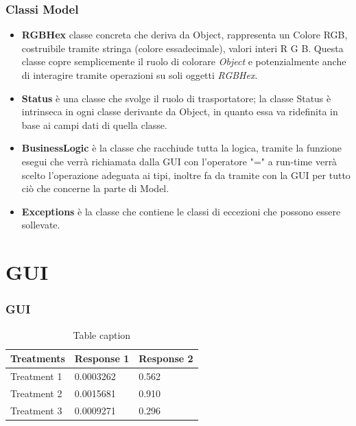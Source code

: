\documentclass[10pt]{beamer}
\begin{document}

\begin{frame}
\frametitle{Classi Model}
\begin{itemize}
\item \textbf{RGBHex} classe concreta che deriva da Object, rappresenta un Colore RGB, costruibile tramite stringa (colore essadecimale), valori interi R G B.
Questa classe copre semplicemente il ruolo di colorare \textit{Object} e potenzialmente anche di interagire tramite operazioni su soli oggetti \textit{RGBHex}.

\item \textbf{Status} è una classe che svolge il ruolo di trasportatore; la classe Status è intrinseca in ogni classe derivante da Object, in quanto essa va ridefinita in base ai campi dati di quella classe. 

\item \textbf{BusinessLogic} è la classe che racchiude tutta la logica, tramite la funzione esegui che verrà richiamata dalla GUI con l'operatore "=" a run-time verrà scelto l'operazione adeguata ai tipi, inoltre fa da tramite con la GUI per tutto ciò che concerne la parte di Model.
\item \textbf{Exceptions} è la classe che contiene le classi di eccezioni che possono essere sollevate.
\end{itemize}
\end{frame}

\section{GUI}

\begin{frame}
\frametitle{GUI}
\begin{table}
\begin{tabular}{l l l}
\toprule
\textbf{Treatments} & \textbf{Response 1} & \textbf{Response 2}\\
\midrule
Treatment 1 & 0.0003262 & 0.562 \\
Treatment 2 & 0.0015681 & 0.910 \\
Treatment 3 & 0.0009271 & 0.296 \\
\bottomrule
\end{tabular}
\caption{Table caption}
\end{table}
\end{frame}
\end{document}
